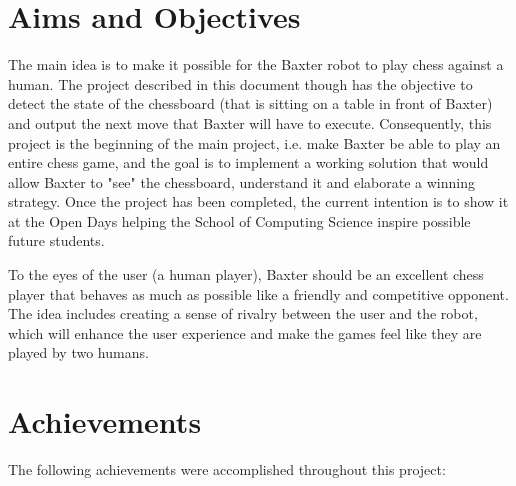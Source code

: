 \documentclass{l4proj}
\begin{document}
\section{Aims and Objectives}
The main idea is to make it possible for the Baxter robot to play chess against a human. The project described in this document though has the objective to detect the state of the chessboard (that is sitting on a table in front of Baxter) and output the next move that Baxter will have to execute. Consequently, this project is the beginning of the main project, i.e. make Baxter be able to play an entire chess game, and the goal is to implement a working solution that would allow Baxter to "see" the chessboard, understand it and elaborate a winning strategy. Once the project has been completed, the current intention is to show it at the Open Days helping the School of Computing Science inspire possible future students.

To the eyes of the user (a human player), Baxter should be an excellent chess player that behaves as much as possible like a friendly and competitive opponent. The idea includes creating a sense of rivalry between the user and the robot, which will enhance the user experience and make the games feel like they are played by two humans.


\section{Achievements}

The following achievements were accomplished throughout this project: 
\end{document}
